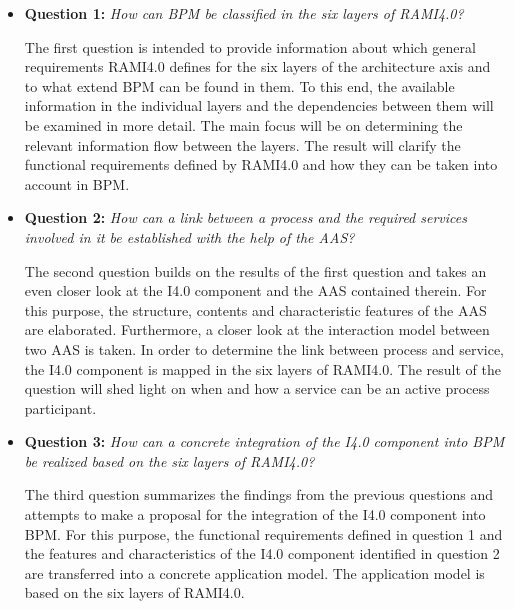 \begin{itemize}
    \item [] \textbf{Question 1:} \textit{How can \ac{BPM} be classified in the six layers of \ac{RAMI4.0}?}
    
    The first question is intended to provide information about which general requirements \ac{RAMI4.0} defines for the six layers of the architecture axis and to what extend \ac{BPM} can be found in them. To this end, the available information in the individual layers and the dependencies between them will be examined in more detail. The main focus will be on determining the relevant information flow between the layers. The result will clarify the functional requirements defined by \ac{RAMI4.0} and how they can be taken into account in \ac{BPM}.
    
    \item [] \textbf{Question 2:} \textit{How can a link between a process and the required services involved in it be established with the help of the \ac{AAS}?}
    
    The second question builds on the results of the first question and takes an even closer look at the \ac{I4.0} component and the \ac{AAS} contained therein. For this purpose, the structure, contents and characteristic features of the \ac{AAS} are elaborated. Furthermore, a closer look at the interaction model between two \ac{AAS} is taken. In order to determine the link between process and service, the \ac{I4.0} component is mapped in the six layers of \ac{RAMI4.0}. The result of the question will shed light on when and how a service can be an active process participant.
    
    \item[] \textbf{Question 3:} \textit{How can a concrete integration of the \ac{I4.0} component into BPM be realized based on the six layers of \ac{RAMI4.0}?}
    
    The third question summarizes the findings from the previous questions and attempts to make a proposal for the integration of the \ac{I4.0} component into BPM. For this purpose, the functional requirements defined in question 1 and the features and characteristics of the \ac{I4.0} component identified in question 2 are transferred into a concrete application model. The application model is based on the six layers of \ac{RAMI4.0}. 

\end{itemize}

